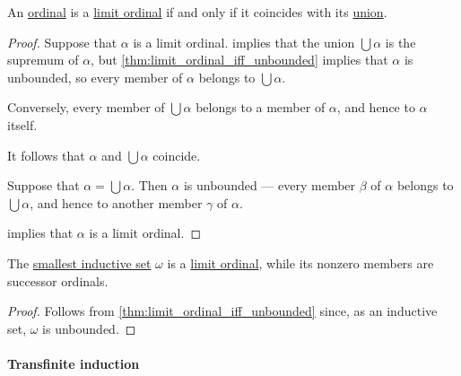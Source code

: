 \begin{corollary}\label{thm:limit_ordinal_iff_union}
  An \hyperref[def:ordinal]{ordinal} is a \hyperref[def:ordinal_successor]{limit ordinal} if and only if it coincides with its \hyperref[def:set_union]{union}.
\end{corollary}
\begin{proof}
  \SufficiencySubProof Suppose that \( \alpha \) is a limit ordinal.  implies that the union \( \bigcup \alpha \) is the supremum of \( \alpha \), but \cref{thm:limit_ordinal_iff_unbounded} implies that \( \alpha \) is unbounded, so every member of \( \alpha \) belongs to \( \bigcup \alpha \).

  Conversely, every member of \( \bigcup \alpha \) belongs to a member of \( \alpha \), and hence to \( \alpha \) itself.

  It follows that \( \alpha \) and \( \bigcup \alpha \) coincide.

  \NecessitySubProof Suppose that \( \alpha = \bigcup \alpha \). Then \( \alpha \) is unbounded --- every member \( \beta \) of \( \alpha \) belongs to \( \bigcup \alpha \), and hence to another member \( \gamma \) of \( \alpha \).

   implies that \( \alpha \) is a limit ordinal.
\end{proof}

\begin{proposition}\label{thm:omega_is_limit_ordinal}
  The \hyperref[def:smallest_inductive_set]{smallest inductive set} \( \omega \) is a \hyperref[def:successor_and_limit_ordinal]{limit ordinal}, while its nonzero members are successor ordinals.
\end{proposition}
\begin{proof}
  Follows from \cref{thm:limit_ordinal_iff_unbounded} since, as an inductive set, \( \omega \) is unbounded.
\end{proof}

\paragraph{Transfinite induction}

